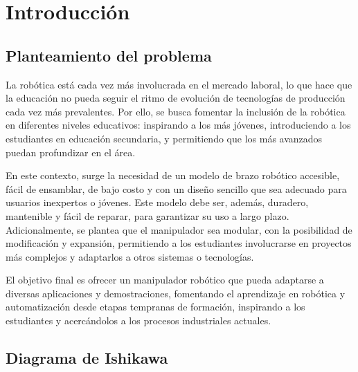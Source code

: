 \section{Introducción}
\subsection{Planteamiento del problema}

La robótica está cada vez más involucrada en el mercado laboral, lo que hace que la educación no pueda seguir el ritmo de evolución de tecnologías de producción cada vez más prevalentes. Por ello, se busca fomentar la inclusión de la robótica en diferentes niveles educativos: inspirando a los más jóvenes, introduciendo a los estudiantes en educación secundaria, y permitiendo que los más avanzados puedan profundizar en el área.

\vspace{1em}

En este contexto, surge la necesidad de un modelo de brazo robótico accesible, fácil de ensamblar, de bajo costo y con un diseño sencillo que sea adecuado para usuarios inexpertos o jóvenes. Este modelo debe ser, además, duradero, mantenible y fácil de reparar, para garantizar su uso a largo plazo. Adicionalmente, se plantea que el manipulador sea modular, con la posibilidad de modificación y expansión, permitiendo a los estudiantes involucrarse en proyectos más complejos y adaptarlos a otros sistemas o tecnologías.

\vspace{1em}

El objetivo final es ofrecer un manipulador robótico que pueda adaptarse a diversas aplicaciones y demostraciones, fomentando el aprendizaje en robótica y automatización desde etapas tempranas de formación, inspirando a los estudiantes y acercándolos a los procesos industriales actuales.

\subsection{Diagrama de Ishikawa}

\vspace{1em}


